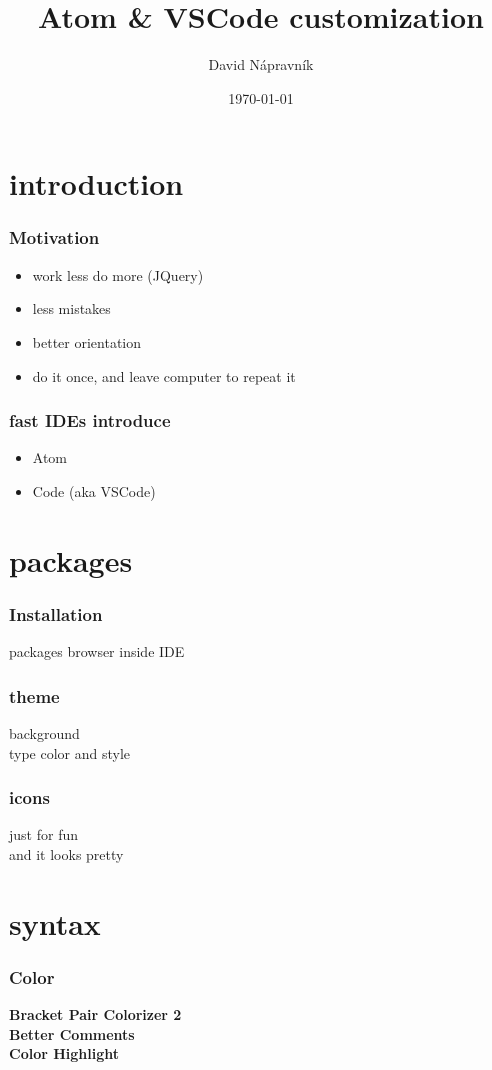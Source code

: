 \documentclass{beamer}
\title[Short title]{Atom \& VSCode customization} %
\author{David Nápravník} %
\institute[mff] %
{
Charles University \\ %
\medskip
\textit{ebrithil@nogare.cz} %
}
\date{\today} %
\begin{document}
\begin{frame}
\titlepage %
\end{frame}


\section{introduction}

\begin{frame}
\frametitle{Motivation}
\begin{itemize}
\item work less do more (JQuery)
\item less mistakes
\item better orientation
\item do it once, and leave computer to repeat it
\end{itemize}


\end{frame}

\begin{frame}
\frametitle{fast IDEs introduce}
\begin{itemize}
\item Atom
\item Code (aka VSCode)
\end{itemize}
\end{frame}

\section{packages}
\begin{frame}
\frametitle{Installation}
packages browser inside IDE\\
\end{frame}

\begin{frame}
\frametitle{theme}
background\\
type color and style
\end{frame}

\begin{frame}
\frametitle{icons}
just for fun\\
and it looks pretty
\end{frame}


\section{syntax}
\begin{frame}
\frametitle{Color}
\textbf{Bracket Pair Colorizer 2}\\
\textbf{Better Comments}\\
\textbf{Color Highlight}

\end{frame}
\end{document}
